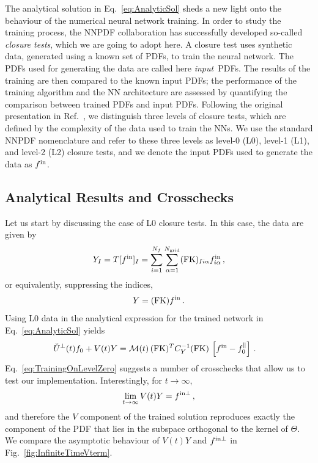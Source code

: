 The analytical solution in Eq.~\eqref{eq:AnalyticSol} sheds a new light onto the
behaviour of the numerical neural network training. In order to study the
training process, the NNPDF collaboration has successfully developed so-called
{\em closure tests}, which we are going to adopt here. A closure test uses
synthetic data, generated using a known set of PDFs, to train the neural
network. The PDFs used for generating the data are called here {\em input}\
PDFs. The results of the training are then compared to the known input PDFs; the
performance of the training algorithm and the NN architecture are assessed by
quantifying the comparison between trained PDFs and input PDFs. Following the
original presentation in Ref.~\cite{NNPDF:2014otw}, we distinguish three levels
of closure tests, which are defined by the complexity of the data used to train
the NNs. We use the standard NNPDF nomenclature and refer to these three levels
as level-0 (L0), level-1 (L1), and level-2 (L2) closure tests, and we denote the
input PDFs used to generate the data as $f^{\rm in}$.

\subsection{Analytical Results and Crosschecks}
\label{sec:AnalyticalChecks}
Let us start by discussing the case of L0 closure tests. In this case, the data
are given by
\begin{equation}
    \label{eq:DataL0}
    Y_I = T[f^{\rm in}]_I
        = \sum_{i=1}^{N_{f}} \sum_{\alpha=1}^{N_{\mathrm{grid}}} (\mathrm{FK})_{Ii\alpha} f^{\rm in}_{i\alpha}\, ,
\end{equation}
or equivalently, suppressing the indices,
\begin{equation}
    \label{eq:DataL0NoIndices}
    Y = (\mathrm{FK}) f^{\rm in}\, .
\end{equation}
Using L0 data in the analytical expression for the trained network in
Eq.~\eqref{eq:AnalyticSol} yields
\begin{align}
  \label{eq:TrainingOnLevelZero}
  \check{U}^\perp(t) f_0 + V(t) Y 
    &= \mathcal{M}(t)\, (\mathrm{FK})^T C_{Y}^{-1} (\mathrm{FK})\, 
      \left[f^{\rm in} - f_{0}^\parallel\right]\, .
\end{align}
Eq.~\eqref{eq:TrainingOnLevelZero} suggests a number of crosschecks that allow
us to test our implementation. Interestingly, for $t\to\infty$,
\begin{align}
    \label{eq:LevelZeroClosureInfiniteTraining}
    \lim_{t\to\infty} V(t) Y = f^{\rm in \perp}\, ,
\end{align}
and therefore the $V$ component of the trained solution reproduces exactly the
component of the PDF that lies in  the subspace orthogonal to the kernel of
$\Theta$. We compare the asymptotic behaviour of $V(t) Y$ and $f^{\rm in \perp}$ in
Fig.~\ref{fig:InfiniteTimeVterm}.

